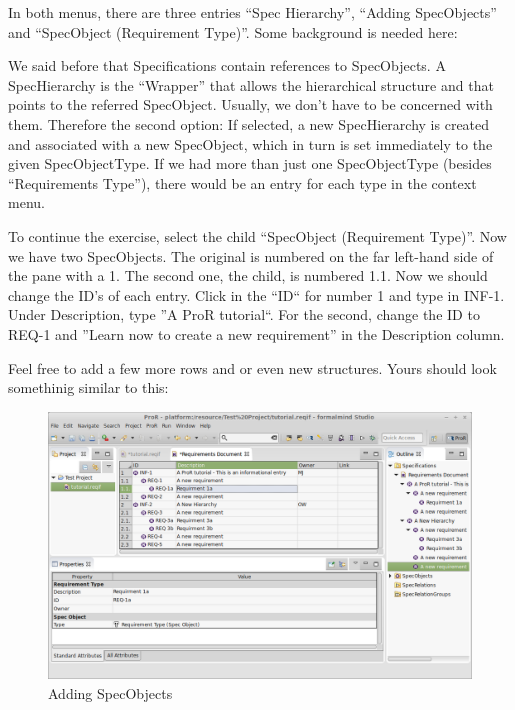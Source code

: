 In both menus, there are three entries ``Spec Hierarchy'', ``Adding SpecObjects'' and ``SpecObject (Requirement Type)''.  Some background is needed here:

We said before that Specifications contain references to SpecObjects.  A SpecHierarchy is the ``Wrapper'' that allows the hierarchical structure and that points to the referred SpecObject.  Usually, we don't have to be concerned with them.  Therefore the second option: If selected, a new SpecHierarchy is created and associated with a new SpecObject, which in turn is set immediately to the given SpecObjectType.  If we had more than just one SpecObjectType (besides ``Requirements Type''), there would be an entry for each type in the context menu.

To continue the exercise, select the child ``SpecObject (Requirement Type)''.  Now we have two SpecObjects.  The original is numbered on the far left-hand side of the pane with a 1.  The second one, the child, is numbered 1.1.  Now we should change the ID's of each entry.  Click in the ``ID`` for number 1 and type in INF-1.  Under Description, type ''A ProR tutorial``.  For the second, change the ID to REQ-1 and ''Learn now to create a new requirement'' in the Description column.

Feel free to add a few more rows and or even new structures.  Yours should look somethinig similar to this:

\begin{figure}[h!]
\centering
\includegraphics[width=\linewidth]{../rmf-images/hierarchy_example.png}      
\caption{Adding SpecObjects}      
\label{fig:Requirements Hierarchy}
\end{figure}

